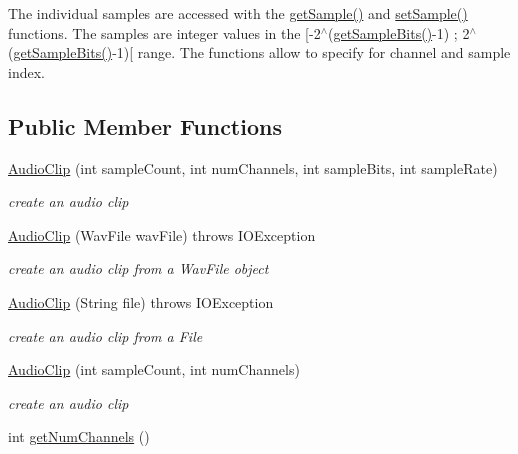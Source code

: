 The individual samples are accessed with the \hyperlink{classbridges_1_1base_1_1_audio_clip_a0db520ed7ad301161e03a55b783856f8}{get\+Sample()} and \hyperlink{classbridges_1_1base_1_1_audio_clip_a896e82f2788b319569c4f0e8f919ffc9}{set\+Sample()} functions. The samples are integer values in the \mbox{[}-\/2$^\wedge$(\hyperlink{classbridges_1_1base_1_1_audio_clip_a59e5a3f38768e52c15e43b5679f3f09c}{get\+Sample\+Bits()}-\/1) ; 2$^\wedge$(\hyperlink{classbridges_1_1base_1_1_audio_clip_a59e5a3f38768e52c15e43b5679f3f09c}{get\+Sample\+Bits()}-\/1)\mbox{[} range. The functions allow to specify for channel and sample index. \subsection*{Public Member Functions}
\begin{DoxyCompactItemize}
\item 
\hyperlink{classbridges_1_1base_1_1_audio_clip_a83e87997fd53dbcbde7680b90c1ff3f2}{Audio\+Clip} (int sample\+Count, int num\+Channels, int sample\+Bits, int sample\+Rate)
\begin{DoxyCompactList}\small\item\em create an audio clip \end{DoxyCompactList}\item 
\hyperlink{classbridges_1_1base_1_1_audio_clip_aece4ed61f09688a54e636ce3dc206239}{Audio\+Clip} (Wav\+File wav\+File)  throws I\+O\+Exception
\begin{DoxyCompactList}\small\item\em create an audio clip from a Wav\+File object \end{DoxyCompactList}\item 
\hyperlink{classbridges_1_1base_1_1_audio_clip_a70d5f6f10dad6da2f27bb04b7021e2fa}{Audio\+Clip} (String file)  throws I\+O\+Exception 
\begin{DoxyCompactList}\small\item\em create an audio clip from a File \end{DoxyCompactList}\item 
\hyperlink{classbridges_1_1base_1_1_audio_clip_aca2a5258c29b104bf8216ae5ec3c5938}{Audio\+Clip} (int sample\+Count, int num\+Channels)
\begin{DoxyCompactList}\small\item\em create an audio clip \end{DoxyCompactList}\item 
int \hyperlink{classbridges_1_1base_1_1_audio_clip_a09e8b5da5249851f7583e910f24b0395}{get\+Num\+Channels} ()

\end{DoxyCompactItemize}
